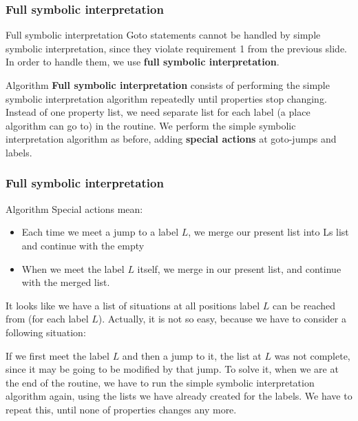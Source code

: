 \documentclass[presentation]{beamer}
\begin{document}
\begin{frame}
  \frametitle{Full symbolic interpretation}
  \begin{block}{Full symbolic interpretation}
  Goto statements cannot be handled by simple symbolic interpretation, since they
violate requirement 1 from the previous slide. In order to handle them, we use \textbf{full symbolic interpretation}. 
  
  \end{block}
  
  \begin{block}{Algorithm}
  \textbf{Full symbolic interpretation} consists of performing the simple symbolic interpretation algorithm repeatedly until properties stop changing. Instead of one property list, we need separate list for each label (a place algorithm can go to) in the routine. We perform the simple symbolic interpretation algorithm as before, adding \textbf{special actions} at goto-jumps and labels.
  \end{block}
  
\end{frame}

\begin{frame}
  \frametitle{Full symbolic interpretation}
  
  \begin{block}{Algorithm}
  Special actions mean:
  \begin{itemize}
      \item Each time we meet a
jump to a label $L$, we merge our present list into L\textquotesingle s list and continue with the empty
    \item When we meet the label $L$ itself, we merge in our present list, and continue with
the merged list.
  \end{itemize}
  It looks like we have a list of situations at all positions label $L$ can be reached from (for each label $L$). Actually, it is not so easy, because we have to consider a following situation: 

If we first meet the label $L$ and then a jump to it, the list at $L$ was not complete,
since it may be going to be modified by that jump. To solve it, when we are at the end of the
routine, we have to run the simple symbolic interpretation algorithm again, using the
lists we have already created for the labels. We have to repeat this, until none of properties
changes any more.
 
  \end{block}
  
\end{frame}
\end{document}

